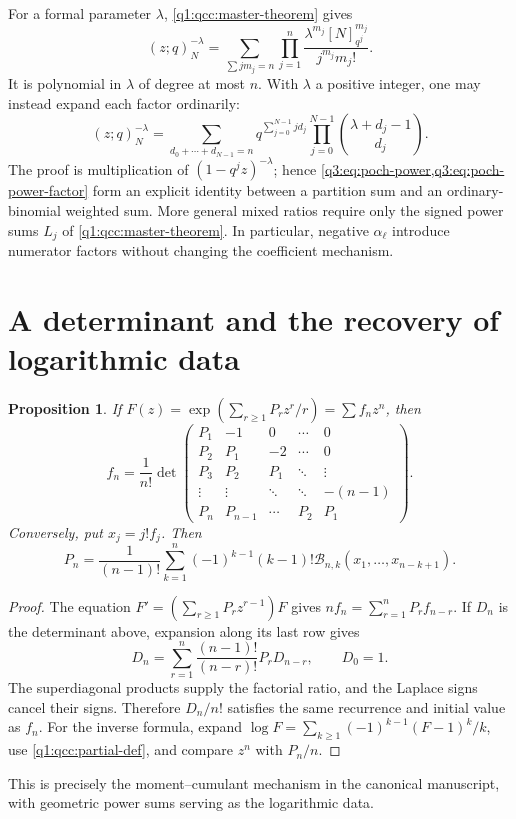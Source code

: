 \documentclass[11pt,a4paper,oneside,openany]{book}
\newtheorem{proposition}[theorem]{Proposition}
\theoremstyle{definition}
\theoremstyle{remark}
\newcommand{\B}[2]{\mathcal B_{#1,#2}}
\newcommand{\coef}[2]{[#1^{#2}]}
\begin{document}
For a formal parameter $\lambda$, \cref{q1:qcc:master-theorem} gives
\begin{equation}
 \coef zn(z;q)_N^{-\lambda}
 =\sum_{\sum j m_j=n}\prod_{j=1}^n
       \frac{\lambda^{m_j}[N]_{q^j}^{m_j}}{j^{m_j}m_j!}.
 \label{q3:eq:poch-power}
\end{equation}
It is polynomial in $\lambda$ of degree at most $n$. With $\lambda$ a
positive integer, one may instead expand each factor ordinarily:
\begin{equation}
 \coef zn(z;q)_N^{-\lambda}
 =\sum_{d_0+\cdots+d_{N-1}=n}
       q^{\sum_{j=0}^{N-1}jd_j}
       \prod_{j=0}^{N-1}\binom{\lambda+d_j-1}{d_j}.
 \label{q3:eq:poch-power-factor}
\end{equation}
The proof is multiplication of $(1-q^jz)^{-\lambda}$; hence
\cref{q3:eq:poch-power,q3:eq:poch-power-factor} form an explicit identity
between a partition sum and an ordinary-binomial weighted sum.
More general mixed ratios require only the signed power sums $L_j$ of
\cref{q1:qcc:master-theorem}. In particular, negative $\alpha_\ell$ introduce numerator
factors without changing the coefficient mechanism.
\section{A determinant and the recovery of logarithmic data}
\begin{proposition}\label{q1:qcc:determinant}
If \(F(z)=\exp(\sum_{r\ge1}P_rz^r/r)=\sum f_nz^n\), then
\begin{equation}\label{q1:qcc:det-formula}
 f_n=\frac1{n!}
 \det\begin{pmatrix}
 P_1&-1&0&\cdots&0\\
 P_2&P_1&-2&\cdots&0\\
 P_3&P_2&P_1&\ddots&\vdots\\
 \vdots&\vdots&\ddots&\ddots&-(n-1)\\
 P_n&P_{n-1}&\cdots&P_2&P_1
 \end{pmatrix}.
\end{equation}
Conversely, put \(x_j=j!f_j\). Then
\begin{equation}\label{q1:qcc:inverse-bell-log}
 P_n=\frac1{(n-1)!}\sum_{k=1}^n(-1)^{k-1}(k-1)!
                   \B nk(x_1,\ldots,x_{n-k+1}).
\end{equation}
\end{proposition}
\begin{proof}
The equation \(F'=(\sum_{r\ge1}P_rz^{r-1})F\) gives
\(nf_n=\sum_{r=1}^nP_rf_{n-r}\). If \(D_n\) is the determinant above, expansion
along its last row gives
\[
 D_n=\sum_{r=1}^n\frac{(n-1)!}{(n-r)!}P_rD_{n-r},\qquad D_0=1.
\]
The superdiagonal products supply the factorial ratio, and the Laplace signs
cancel their signs. Therefore \(D_n/n!\) satisfies the same recurrence and
initial value as \(f_n\).
For the inverse formula, expand
\(\log F=\sum_{k\ge1}(-1)^{k-1}(F-1)^k/k\), use
\eqref{q1:qcc:partial-def}, and compare \(z^n\) with \(P_n/n\).
\end{proof}
This is precisely the moment--cumulant mechanism in the canonical manuscript, with
geometric power sums serving as the logarithmic data.
\end{document}
